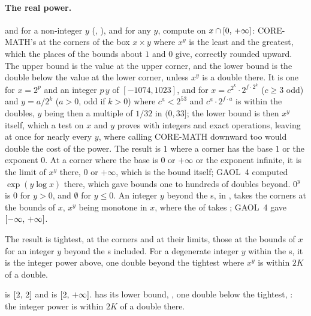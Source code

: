 \paragraph{The real power.}
 and  for a non-integer $y$
(, ), and
 for any $y$, compute  on
$x\cap[0,\,+\infty]$: CORE-MATH's  at the corners of the box
$x\times y$ where $x^y$ is the least and the greatest, which the places of
the bounds about $1$ and $0$ give, correctly rounded upward. The upper bound
is the value at the upper corner, and the lower bound is the double below
the value at the lower corner, unless $x^y$ is a double there. It is one
for $x=2^p$ and an integer $p\,y$ of $[-1074, 1023]$, and for
$x=c^{2^k}\cdot2^{f\cdot2^k}$ ($c\geq3$ odd) and $y=a/2^k$ ($a>0$, odd if
$k>0$) where $c^a<2^{53}$ and $c^a\cdot2^{f\cdot a}$ is within the doubles,
$y$ being then a multiple of $1/32$ in $(0, 33]$; the lower bound is then
$x^y$ itself, which a test on $x$ and $y$ proves with integers and exact
operations, leaving at once for nearly every $y$, where calling CORE-MATH
downward too would double the cost of the power.\newinvfive{} The result
is $1$ where a corner has the base $1$ or the exponent $0$. At a corner
where the base is $0$ or $+\infty$ or the exponent infinite, it is the
limit of $x^y$ there, $0$ or $+\infty$, which is the bound itself; GAOL~4
computed $\exp(y\log x)$ there, which gave bounds one to hundreds of
doubles beyond.\newinvfive{} $0^y$ is $0$ for $y>0$, and $\emptyset$ for
$y\leq0$. An integer $y$ beyond the s, in
, takes the corners at the bounds of $x$, $x^y$
being monotone in $x$, where the  of  takes
; GAOL~4 gave $[-\infty,\,+\infty]$.\newinvfive

The result is tightest, at the corners and at their limits, those at the
bounds of $x$ for an integer $y$ beyond the s included. For a
degenerate integer $y$ within the s, it is the integer power
above, one double beyond the tightest where $x^y$ is within $2K$ of a
double.

\begin{Ex}
 is $[2,\,2]$ and  is
$[2,\,+\infty]$. 
has its lower bound, , one double below the
tightest, : the integer power is within $2K$ of
a double there.
\end{Ex}

